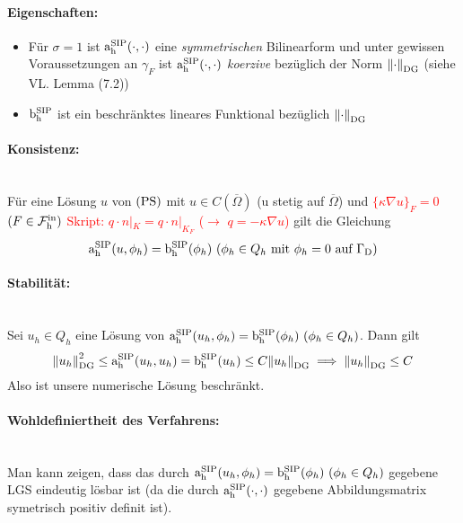 \paragraph{Eigenschaften:}
\begin{itemize}
	\item Für $ \sigma = 1 $ ist $ \operatorname{a_h^{\text{SIP}}}(\cdot,\cdot) $ eine \emph{symmetrischen} Bilinearform und unter gewissen Voraussetzungen an $ \gamma_F $ ist $ \operatorname{a_h^{\text{SIP}}}(\cdot,\cdot) $ \emph{koerzive} bezüglich der Norm $ \norm{\cdot}_{\text{DG}} $ (siehe VL. Lemma (7.2))
	\item $ \operatorname{b_h^{\text{SIP}}} $ ist ein beschränktes lineares Funktional bezüglich $ \norm{\cdot}_{\text{DG}} $ 
\end{itemize}

\paragraph{Konsistenz:}~\\
Für eine Lösung $ u $ von $ \operatorname{(PS)} $ mit $ u \in C(\overline{\Omega}) $ (u stetig auf $ \overline{\Omega} $) und  \textcolor{red}{$ \{\kappa \nabla u\}_F =0$   $(F \in \operatorname{\mathcal{F}_h^{\text{in}}})$} \textcolor{red}{Skript: $q \cdot n|_K = q \cdot n|_{K_F} $ ($\rightarrow$ $q = - \kappa \nabla u$)}
gilt die Gleichung
\[ \operatorname{a_h^{\text{SIP}}}(u,\phi_h) = \operatorname{b_h^{\text{SIP}}}(\phi_h) \ (\phi_h \in Q_h \text{ mit } \phi_h = 0 \text{ auf } \Gamma_{\text{D}}) \]

\paragraph{Stabilität:}~\\
Sei $ u_h \in Q_h $ eine Lösung von $ \operatorname{a_h^{\text{SIP}}}(u_h, \phi_h) = \operatorname{b_h^{\text{SIP}}}(\phi_h) \ (\phi_h \in Q_h) $. Dann gilt
\[ \norm{u_h}_{\text{DG}}^2 \le \operatorname{a_h^{\text{SIP}}}(u_h, u_h) = \operatorname{b_h^{\text{SIP}}}(u_h) \le C \norm{u_h}_{\text{DG}} \implies \norm{u_h}_{\text{DG}} \le C \]
Also ist unsere numerische Lösung beschränkt. 

\paragraph{Wohldefiniertheit des Verfahrens:}~\\
Man kann zeigen, dass das durch $ \operatorname{a_h^{\text{SIP}}}(u_h, \phi_h) = \operatorname{b_h^{\text{SIP}}}(\phi_h) \ (\phi_h \in Q_h) $ gegebene LGS eindeutig lösbar ist (da die durch $ \operatorname{a_h^{\text{SIP}}}(\cdot, \cdot)  $ gegebene Abbildungsmatrix symetrisch positiv definit ist).
